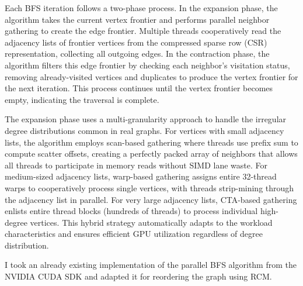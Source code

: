 Each BFS iteration follows a two-phase process. In the expansion phase, the algorithm takes the current vertex frontier and performs parallel neighbor gathering to create the edge frontier. Multiple threads cooperatively read the adjacency lists of frontier vertices from the compressed sparse row (CSR) representation, collecting all outgoing edges. In the contraction phase, the algorithm filters this edge frontier by checking each neighbor's visitation status, removing already-visited vertices and duplicates to produce the vertex frontier for the next iteration. This process continues until the vertex frontier becomes empty, indicating the traversal is complete.

The expansion phase uses a multi-granularity approach to handle the irregular degree distributions common in real graphs. For vertices with small adjacency lists, the algorithm employs scan-based gathering where threads use prefix sum to compute scatter offsets, creating a perfectly packed array of neighbors that allows all threads to participate in memory reads without SIMD lane waste. For medium-sized adjacency lists, warp-based gathering assigns entire 32-thread warps to cooperatively process single vertices, with threads strip-mining through the adjacency list in parallel. For very large adjacency lists, CTA-based gathering enlists entire thread blocks (hundreds of threads) to process individual high-degree vertices. This hybrid strategy automatically adapts to the workload characteristics and ensures efficient GPU utilization regardless of degree distribution.

I took an already existing implementation of the parallel BFS algorithm from the NVIDIA CUDA SDK \cite{kaleta_kaletapbfs-cuda-gpu_2025} and adapted it for reordering the graph using RCM.

